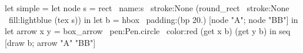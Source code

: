 let simple =
  let node s =
    rect ~name:s ~stroke:None (round_rect ~stroke:None ~fill:lightblue (tex s))
  in
  let b = hbox ~padding:(bp 20.) [node "A"; node "BB"] in
  let arrow x y = box_arrow ~pen:Pen.circle ~color:red (get x b) (get y b) in
  seq [draw b; arrow "A" "BB"]
